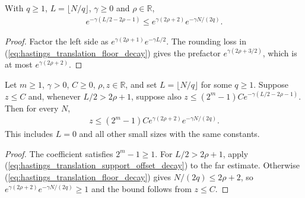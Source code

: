 \begin{lemma}
    \label{lem:hastings_translation_support_offset_decay}
    \leanok
    With $q\ge1$, $L=\lfloor N/q\rfloor$, $\gamma\ge0$ and $\rho\in\mathbb R$,
    \begin{align}
        e^{-\gamma(L/2-2\rho-1)}
        \le e^{\gamma(2\rho+2)}e^{-\gamma N/(2q)}.
        \label{eq:hastings_translation_support_offset_decay}
    \end{align}
\end{lemma}
\begin{proof}\leanok
    Factor the left side as $e^{\gamma(2\rho+1)}e^{-\gamma L/2}$.
    The rounding loss in
    (\ref{eq:hastings_translation_floor_decay}) gives the prefactor
    $e^{\gamma(2\rho+3/2)}$, which is at most $e^{\gamma(2\rho+2)}$.
\end{proof}

\begin{lemma}
    \label{lem:hastings_translation_near_far_decay}
    \leanok
    Let $m\ge1$, $\gamma>0$, $C\ge0$, $\rho,z\in\mathbb R$, and set
    $L=\lfloor N/q\rfloor$ for some $q\ge1$. Suppose $z\le C$ and, whenever
    $L/2>2\rho+1$, suppose also
    $z\le(2^m-1)C e^{-\gamma(L/2-2\rho-1)}$. Then for every $N$,
    \begin{align}
        z\le(2^m-1)C e^{\gamma(2\rho+2)}e^{-\gamma N/(2q)}.
        \label{eq:hastings_translation_near_far_decay}
    \end{align}
    This includes $L=0$ and all other small sizes with the same constants.
\end{lemma}
\begin{proof}\leanok
    The coefficient satisfies $2^m-1\ge1$. For $L/2>2\rho+1$, apply
    (\ref{eq:hastings_translation_support_offset_decay}) to the far estimate.
    Otherwise (\ref{eq:hastings_translation_floor_decay}) gives
    $N/(2q)\le2\rho+2$, so
    $e^{\gamma(2\rho+2)}e^{-\gamma N/(2q)}\ge1$ and the bound follows
    from $z\le C$.
\end{proof}

